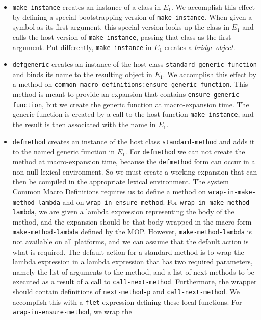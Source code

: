 \begin{itemize}
\item \texttt{make-instance} creates an instance of a class in $E_1$.
  We accomplish this effect by defining a special bootstrapping
  version of \texttt{make-instance}.  When given a symbol as its first
  argument, this special version looks up the class in $E_1$ and calls
  the host version of \texttt{make-instance}, passing that class as
  the first argument.  Put differently, \texttt{make-instance} in
  $E_1$ creates a \emph{bridge object}.
\item \texttt{defgeneric} creates an instance of the host class
  \texttt{standard-generic-function} and binds its name to the
  resulting object in $E_1$.  We accomplish this effect by a method on
  \texttt{common-macro-definitions:ensure-generic-function}.  This
  method is meant to provide an expansion that contains
  \texttt{ensure-generic-function}, but we create the generic function
  at macro-expansion time.  The generic function is created by a call
  to the host function \texttt{make-instance}, and the result is then
  associated with the name in $E_1$.
\item \texttt{defmethod} creates an instance of the host class
  \texttt{standard-method} and adds it to the named generic function
  in $E_1$.  For \texttt{defmethod} we can not create the method at
  macro-expansion time, because the \texttt{defmethod} form can occur
  in a non-null lexical environment.  So we must create a working
  expansion that can then be compiled in the appropriate lexical
  environment.  The system Common Macro Definitions requires us to
  define a method on \texttt{wrap-in-make-method-lambda} and on
  \texttt{wrap-in-ensure-method}.  For
  \texttt{wrap-in-make-method-lambda}, we are given a lambda
  expression representing the body of the method, and the expansion
  should be that body wrapped in the macro form
  \texttt{make-method-lambda} defined by the MOP.  However,
  \texttt{make-method-lambda} is not available on all platforms, and
  we can assume that the default action is what is required.  The
  default action for a standard method is to wrap the lambda
  expression in a lambda expression that has two required parameters,
  namely the list of arguments to the method, and a list of next
  methods to be executed as a result of a call to
  \texttt{call-next-method}.  Furthermore, the wrapper should contain
  definitions of \texttt{next-method-p} and \texttt{call-next-method}.
  We accomplish this with a \texttt{flet} expression defining these
  local functions.  For \texttt{wrap-in-ensure-method}, we wrap the

\end{itemize}
